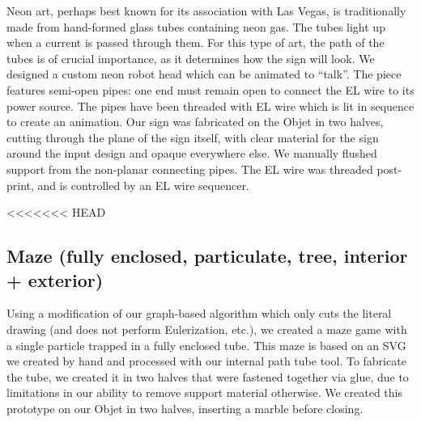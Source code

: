 Neon art, perhaps best known for its association with Las Vegas, is traditionally made from hand-formed glass tubes containing neon gas.  The tubes light up when a current is passed through them.  For this type of art, the path of the tubes is of crucial importance, as it determines how the sign will look.  We designed a custom neon robot head which can be animated to ``talk''.  The piece features semi-open pipes: one end must remain open to connect the EL wire to its power source.  The pipes have been threaded with EL wire which is lit in sequence to create an animation.  Our sign was fabricated on the Objet in two halves, cutting through the plane of the sign itself, with clear material for the sign around the input design and opaque everywhere else.  We manually flushed support from the non-planar connecting pipes.  The EL wire was threaded post-print, and is controlled by an EL wire sequencer.

<<<<<<< HEAD
\subsection{Maze (fully enclosed, particulate, tree, interior + exterior)}

Using a modification of our graph-based algorithm which only cuts the literal drawing (and does not perform Eulerization, etc.), we created a maze game with a single particle trapped in a fully enclosed tube.  This maze is based on an SVG we created by hand and processed with our internal path tube tool.  To fabricate the tube, we created it in two halves that were fastened together via glue, due to limitations in our ability to remove support material otherwise.     We created this prototype on our Objet in two halves, inserting a marble before closing.